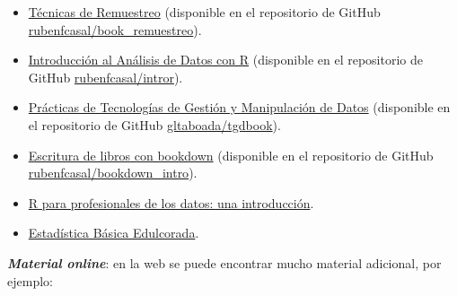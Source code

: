 \documentclass[]{book}
\theoremstyle{definition}
\theoremstyle{definition}
\theoremstyle{definition}
\theoremstyle{remark}
\begin{document}
\begin{itemize}
  \begin{itemize}
  \item
    \href{https://rubenfcasal.github.io/book_remuestreo}{Técnicas de
    Remuestreo} (disponible en el repositorio de GitHub
    \href{https://github.com/rubenfcasal/book_remuestreo}{rubenfcasal/book\_remuestreo}).
  \item
    \href{https://rubenfcasal.github.io/intror}{Introducción al Análisis
    de Datos con R} (disponible en el repositorio de GitHub
    \href{https://github.com/rubenfcasal/intror}{rubenfcasal/intror}).
  \item
    \href{https://gltaboada.github.io/tgdbook}{Prácticas de Tecnologías
    de Gestión y Manipulación de Datos} (disponible en el repositorio de
    GitHub
    \href{https://github.com/gltaboada/tgdbook}{gltaboada/tgdbook}).
  \item
    \href{https://rubenfcasal.github.io/bookdown_intro/}{Escritura de
    libros con bookdown} (disponible en el repositorio de GitHub
    \href{https://github.com/rubenfcasal/bookdown_intro}{rubenfcasal/bookdown\_intro}).
  \item
    \href{https://www.datanalytics.com/libro_r/index.html}{R para
    profesionales de los datos: una introducción}.
  \item
    \href{https://bookdown.org/aquintela/EBE}{Estadística Básica
    Edulcorada}.
  \end{itemize}
\end{itemize}

\textbf{\emph{Material online}}: en la web se puede encontrar mucho
material adicional, por ejemplo:
\end{document}
